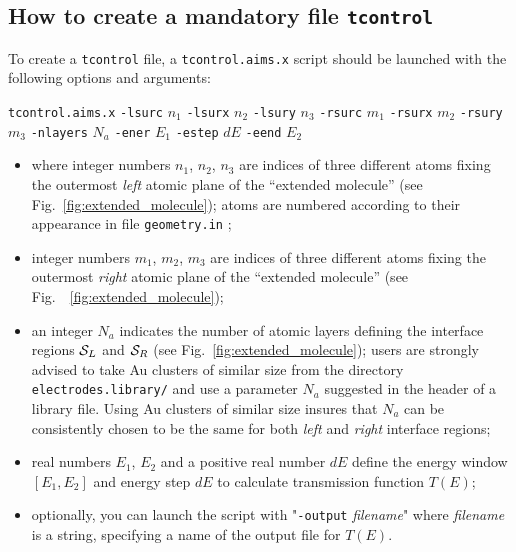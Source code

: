\subsection{%
How to create a mandatory file \texttt{tcontrol}}
\label{subsec:aitranss:tcontrol}

To create a \verb,tcontrol, file, a \verb,tcontrol.aims.x, script should
be launched with the following options and arguments:

\verb,tcontrol.aims.x, 
\verb,-lsurc, $n_1$ 
\verb,-lsurx, $n_2$
\verb,-lsury, $n_3$ 
\verb,-rsurc, $m_1$ 
\verb,-rsurx, $m_2$ 
\verb,-rsury, $m_3$ 
\verb,-nlayers, $N_a$ 
\verb,-ener, $E_1$ 
\verb,-estep, $dE$
\verb,-eend, $E_2$

\begin{itemize}

\item where integer numbers $n_1$, $n_2$, $n_3$ are indices of three
 different atoms fixing the outermost \textit{left} atomic plane of the
 ``extended molecule'' (see Fig.~\ref{fig:extended_molecule}); atoms are
 numbered according to their appearance in file \verb,geometry.in, ;

\item integer numbers $m_1$, $m_2$, $m_3$ are indices of three different
 atoms fixing the outermost \textit{right} atomic plane of the ``extended 
 molecule'' (see Fig.~~\ref{fig:extended_molecule});

\item an integer $N_a$ indicates the number of atomic layers
 defining the interface regions ${\cal S}_L$ and ${\cal S}_R$  (see
 Fig.~\ref{fig:extended_molecule}); users are strongly advised to take Au
 clusters of similar size from the directory \verb,electrodes.library/, and
 use a parameter $N_a$ suggested in the header of a library file.  Using Au
 clusters of similar size insures that $N_a$ can be consistently chosen to
 be the same for both \textit{left} and \textit{right} interface regions;

\item real numbers $E_1$, $E_2$ and a positive real number $dE$ define the
 energy window $[E_1,E_2]$ and energy step $dE$ to calculate transmission
 function $T(E)$;

\item optionally, you can launch the script with "\verb,-output,
 \textit{filename}" where \textit{filename} is a string, specifying a
 name of the output file for $T(E)$.  
\end{itemize}
 
